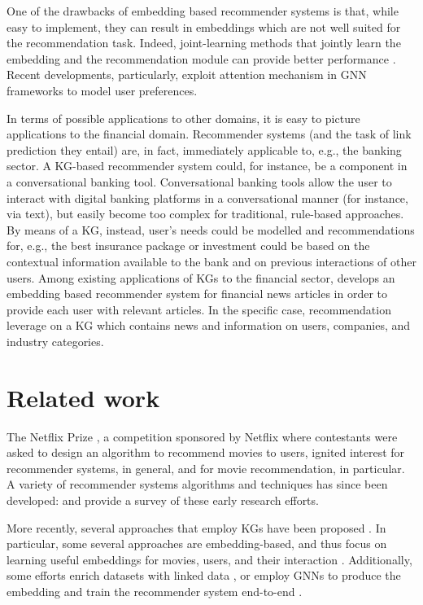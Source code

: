 One of the drawbacks of embedding based recommender systems is that, while easy to implement, they can result in embeddings which are not well suited for the recommendation task.
Indeed, joint-learning methods that jointly learn the embedding and the recommendation module can provide better performance \parencite{guo2020survey}.
Recent developments, particularly, exploit attention mechanism in GNN frameworks to model user preferences. 

In terms of possible applications to other domains, it is easy to picture applications to the financial domain.
Recommender systems (and the task of link prediction they entail) are, in fact, immediately applicable to, e.g., the banking sector.
A KG-based recommender system could, for instance, be a component in a conversational banking tool.
Conversational banking tools allow the user to interact with digital banking platforms in a conversational manner (for instance, via text), but easily become too complex for traditional, rule-based approaches.
By means of a KG, instead, user's needs could be modelled and recommendations for, e.g., the best insurance package or investment could be based on the contextual information available to the bank and on previous interactions of other users. 
Among existing applications of KGs to the financial sector, \cite{ren2019financial} develops an embedding based recommender system for financial news articles in order to provide each user with relevant articles.
In the specific case, recommendation leverage on a KG which contains news and information on users, companies, and industry categories.




\section{Related work}\label{sec:reated}

The Netflix Prize \parencite{bennett2007netflix}, a competition sponsored by Netflix where contestants were asked to design an algorithm to recommend movies to users, ignited interest for recommender systems, in general, and for movie recommendation, in particular.
A variety of recommender systems algorithms and techniques has since been developed: \cite{schafer2007collaborative} and \cite{bobadilla2013recommender} provide a survey of these early research efforts.

More recently, several approaches that employ KGs have been proposed \parencite{grad2015recommendations, guo2020survey}.
In particular, some several approaches are embedding-based, and thus focus on learning useful embeddings for movies, users, and their interaction \parencite{palumbo2017entity2rec, zhang2018learning}.
Additionally, some efforts enrich datasets with linked data \parencite{ostuni2013top}, or employ GNNs to produce the embedding and train the recommender system end-to-end \parencite{wang2019knowledge}.



